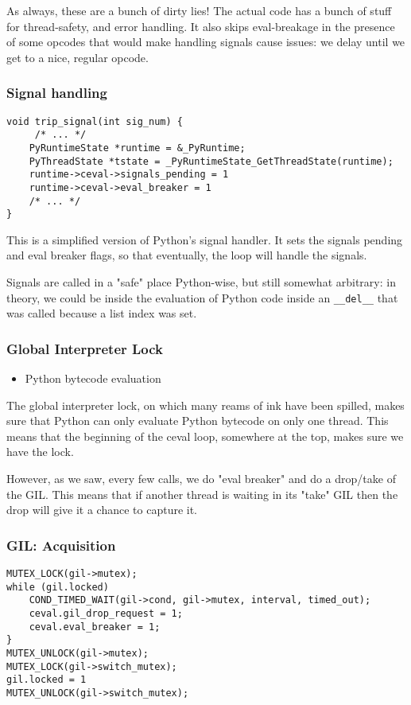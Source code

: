 As always,
these are a bunch of dirty lies!
The actual code has a bunch of stuff for thread-safety,
and error handling.
It also skips eval-breakage in the presence of some opcodes
that would make handling signals cause issues:
we delay until we get to a nice,
regular opcode.

\begin{frame}[fragile]
\frametitle{Signal handling}
\begin{lstlisting}
void trip_signal(int sig_num) {
     /* ... */
    PyRuntimeState *runtime = &_PyRuntime;
    PyThreadState *tstate = _PyRuntimeState_GetThreadState(runtime);
    runtime->ceval->signals_pending = 1
    runtime->ceval->eval_breaker = 1
    /* ... */
}
\end{lstlisting}
\end{frame}

This is a simplified version of Python's signal handler.
It sets the signals pending and eval breaker flags,
so that eventually,
the loop will handle the signals.

Signals are called in a
"safe"
place Python-wise,
but still somewhat arbitrary:
in theory,
we could be inside the evaluation of Python code inside
an \verb|__del__| that was called because a list index was set.


\begin{frame}
\frametitle{Global Interpreter Lock}

\begin{itemize}
\item Python bytecode evaluation
\end{itemize}
\end{frame}

The global interpreter lock,
on which many reams of ink have been spilled,
makes sure that Python can only evaluate Python bytecode
on only one thread.
This means that the beginning of the ceval loop,
somewhere at the top,
makes sure we have the lock.

However,
as we saw,
every few calls,
we do "eval breaker"
and do a drop/take of the GIL.
This means that if another thread is waiting in its
"take"
GIL then the drop will give it a chance to capture it.

\begin{frame}[fragile]
\frametitle{GIL: Acquisition}
\begin{lstlisting}
MUTEX_LOCK(gil->mutex);
while (gil.locked)
    COND_TIMED_WAIT(gil->cond, gil->mutex, interval, timed_out);
    ceval.gil_drop_request = 1;
    ceval.eval_breaker = 1;
}
MUTEX_UNLOCK(gil->mutex);
MUTEX_LOCK(gil->switch_mutex);
gil.locked = 1
MUTEX_UNLOCK(gil->switch_mutex);
\end{lstlisting}
\end{frame}

